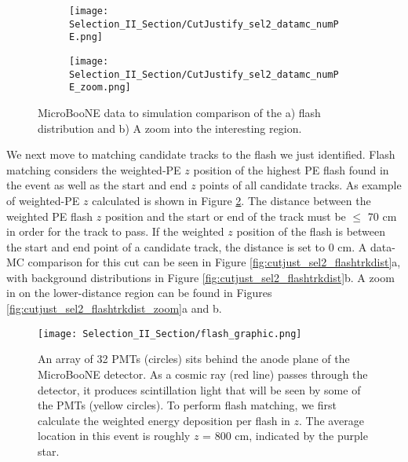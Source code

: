 \begin{figure}[H]
  \centering
  \begin{subfigure}[t]{0.4\textwidth}
    \centering
    \texttt{[image: Selection\_II\_Section/CutJustify\_sel2\_datamc\_numPE.png]}
    \caption{ }
  \end{subfigure} 
  \hspace{10 mm}
  \begin{subfigure}[t]{0.4\textwidth}
    \centering
    \texttt{[image: Selection\_II\_Section/CutJustify\_sel2\_datamc\_numPE\_zoom.png]}
    \caption{ }
  \end{subfigure}
\caption{ MicroBooNE data to simulation comparison of the a) flash distribution and b) A zoom into the interesting region. }
\label{fig:cutjust_sel2_numPE_datamc}
\end{figure}

\par We next move to matching candidate tracks to the flash we just identified.  Flash matching considers the weighted-PE $z$ position of the highest PE flash found in the event as well as the start and end $z$ points of all candidate tracks. As example of weighted-PE $z$ calculated is shown in Figure \ref{fig:flash_graphic}.  The distance between the weighted PE flash $z$ position and the start or end of the track must be $\leq$ 70 cm in order for the track to pass. If the weighted $z$ position of the flash is between the start and end point of a candidate track, the distance is set to 0 cm. A data-MC comparison for this cut can be seen in Figure \ref{fig:cutjust_sel2_flashtrkdist}a, with background distributions in Figure \ref{fig:cutjust_sel2_flashtrkdist}b.  A zoom in on the lower-distance region can be found in Figures \ref{fig:cutjust_sel2_flashtrkdist_zoom}a and b. 

\begin{figure}[h!]
\centering
    \centering
\texttt{[image: Selection\_II\_Section/flash\_graphic.png]}
\caption{ An array of 32 PMTs (circles) sits behind the anode plane of the MicroBooNE detector. As a cosmic ray (red line) passes through the detector, it produces scintillation light that will be seen by some of the PMTs (yellow circles). To perform flash matching, we first calculate the weighted energy deposition per flash in $z$.  The average location in this event is roughly $z$ = 800 cm, indicated by the purple star.} 
\label{fig:flash_graphic}
\end{figure}



